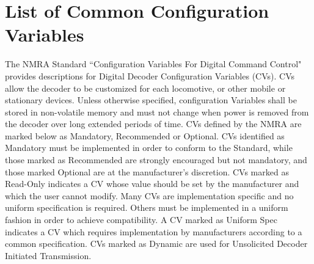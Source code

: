 \chapter{List of Common Configuration Variables}

The NMRA Standard ``Configuration Variables For Digital Command Control" provides descriptions for Digital Decoder Configuration Variables (CVs). CVs allow the decoder to be customized for each locomotive, or other mobile or stationary devices. Unless otherwise specified, configuration Variables shall be stored in non-volatile memory and must not change when power is removed from the decoder over long extended periods of time. CVs defined by the NMRA are marked below as Mandatory, Recommended or Optional. CVs identified as Mandatory must be implemented in order to conform to the Standard, while those marked as Recommended are strongly encouraged but not mandatory, and those marked Optional are at the manufacturer’s discretion. CVs marked as Read-Only indicates a CV whose value should be set by the manufacturer and which the user cannot modify. Many CVs are implementation specific and no uniform specification is required. Others must be implemented in a uniform fashion in order to achieve compatibility. A CV marked as Uniform Spec indicates a CV which requires implementation by manufacturers according to a common specification. CVs marked as Dynamic are used for Unsolicited Decoder Initiated Transmission. 

\scriptsize

